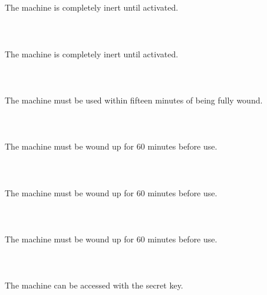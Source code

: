 \documentclass{article}
\begin{document}
    \section{}
    The machine is completely inert until activated.\\\\ 
    \newpage
    
    \section{}
    The machine is completely inert until activated.\\\\ 
    \newpage
    
    \section{}
    The machine must be used within fifteen minutes of being fully wound.\\\\ 
    \newpage
    
    \section{}
    The machine must be wound up for 60 minutes before use.\\\\ 
    \newpage
    
    \section{}
    The machine must be wound up for 60 minutes before use.\\\\ 
    \newpage
    
    \section{}
    The machine must be wound up for 60 minutes before use.\\\\ 
    \newpage
    
    \section{}
    The machine can be accessed with the secret key.\\\\ 
    \newpage
    
\end{document}
